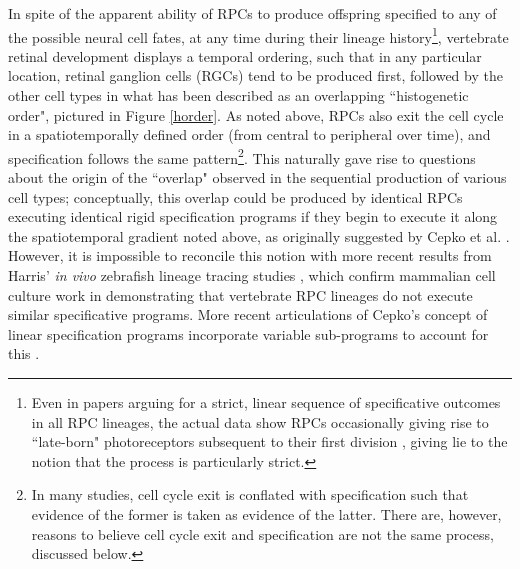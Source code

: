 \documentclass{ut-thesis}
\begin{document}
\begin{NoHyper}
In spite of the apparent ability of RPCs to produce offspring specified to any of the possible neural cell fates, at any time during their lineage history\footnote{Even in papers arguing for a strict, linear sequence of specificative outcomes in all RPC lineages, the actual data show RPCs occasionally giving rise to ``late-born" photoreceptors subsequent to their first division \cite{Wong2009}, giving lie to the notion that the process is particularly strict.}, vertebrate retinal development displays a temporal ordering, such that in any particular location, retinal ganglion cells (RGCs) tend to be produced first, followed by the other cell types in what has been described as an overlapping ``histogenetic order", pictured in Figure \ref{horder}. As noted above, RPCs also exit the cell cycle in a spatiotemporally defined order (from central to peripheral over time), and specification follows the same pattern\footnote{In many studies, cell cycle exit is conflated with specification such that evidence of the former is taken as evidence of the latter. There are, however, reasons to believe cell cycle exit and specification are not the same process, discussed below.}. This naturally gave rise to questions about the origin of the ``overlap" observed in the sequential production of various cell types; conceptually, this overlap could be produced by identical RPCs executing identical rigid specification programs if they begin to execute it along the spatiotemporal gradient noted above, as originally suggested by Cepko et al. \cite{Cepko1996}. However, it is impossible to reconcile this notion with more recent results from Harris' \textit{in vivo} zebrafish lineage tracing studies \cite{Das2003,He2012,Boije2015}, which confirm mammalian cell culture work in demonstrating that vertebrate RPC lineages do not execute similar specificative programs. More recent articulations of Cepko's concept of linear specification programs incorporate variable sub-programs to account for this \cite{Cepko2014}.


\end{NoHyper}
\end{document}
